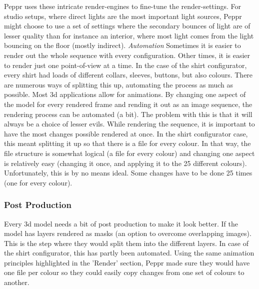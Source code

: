 Peppr uses these intricate render-engines to fine-tune the render-settings. For studio setups, where direct lights are the most important light sources, Peppr might choose to use a set of settings where the secondary bounces of light are of lesser quality than for instance an interior, where most light comes from the light bouncing on the floor (mostly indirect).
\newline
\newline
\textit{Automation}
\newline
Sometimes it is easier to render out the whole sequence with every configuration. Other times, it is easier to render just one point-of-view at a time. In the case of the shirt configurator, every shirt had loads of different collars, sleeves, buttons, but also colours. There are numerous ways of splitting this up, automating the process as much as possible. Most 3d applications allow for animations. By changing one aspect of the model for every rendered frame and rending it out as an image sequence, the rendering process can be automated (a bit). The problem with this is that it will always be a choice of lesser evils. While rendering the sequence, it is important to have the most changes possible rendered at once. In the shirt configurator case, this meant splitting it up so that there is a file for every colour. In that way, the file structure is somewhat logical (a file for every colour) and changing one aspect is relatively easy (changing it once, and applying it to the 25 different colours). Unfortunately, this is by no means ideal. Some changes have to be done 25 times (one for every colour).


\subsubsection{Post Production}
Every 3d model needs a bit of post production to make it look better. If the model has layers rendered as masks (an option to overcome overlapping images). This is the step where they would split them into the different layers. In case of the shirt configurator, this has partly been automated. Using the same animation principles highlighted in the 'Render' section, Peppr made sure they would have one file per colour so they could easily copy changes from one set of colours to another.

